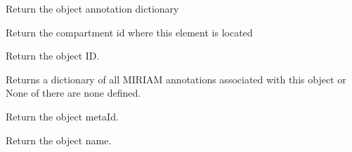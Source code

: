 \documentclass[a4paper,11pt,english]{sphinxmanual}
\begin{document}
\begin{fulllineitems}
\begin{fulllineitems}
\label{modules_doc:cbmpy.CBModel.Fbase.getAnnotations}
Return the object annotation dictionary

\end{fulllineitems}


\begin{fulllineitems}
\label{modules_doc:cbmpy.CBModel.Fbase.getCompartmentId}
Return the compartment id where this element is located

\end{fulllineitems}


\begin{fulllineitems}
\label{modules_doc:cbmpy.CBModel.Fbase.getId}
Return the object ID.

\end{fulllineitems}


\begin{fulllineitems}
\label{modules_doc:cbmpy.CBModel.Fbase.getMIRIAMannotations}
Returns a dictionary of all MIRIAM annotations associated with this object
or None of there are none defined.

\end{fulllineitems}


\begin{fulllineitems}
\label{modules_doc:cbmpy.CBModel.Fbase.getMetaId}
Return the object metaId.

\end{fulllineitems}


\begin{fulllineitems}
\label{modules_doc:cbmpy.CBModel.Fbase.getName}
Return the object name.

\end{fulllineitems}


\end{fulllineitems}
\end{document}
